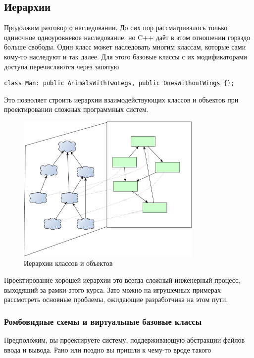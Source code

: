 \documentclass[a4paper,12pt,oneside]{article}
\begin{document}
\subsection{Иерархии}

Продолжим разговор о наследовании. До сих пор рассматривалось только одиночное одноуровневое наследование, но C++ даёт в этом отношении гораздо больше свободы. Один класс может наследовать многим классам, которые сами кому-то наследуют и так далее. Для этого базовые классы с их модификаторами доступа перечисляются через запятую

\begin{lstlisting}
class Man: public AnimalsWithTwoLegs, public OnesWithoutWings {};
\end{lstlisting}

Это позволяет строить иерархии взаимодействующих классов и объектов при проектировании сложных программных систем.

\begin{figure}[h!]
\centering
\includegraphics[width=0.8\textwidth]{illustrations/hierarchies-crop.pdf}
\caption{Иерархии классов и объектов}
\label{fig:hierarchies-crop}
\end{figure}

Проектирование хорошей иерархии это всегда сложный инженерный процесс, выходящий за рамки этого курса. Зато можно на игрушечных примерах рассмотреть основные проблемы, ожидающие разработчика на этом пути.

\subsubsection{Ромбовидные схемы и виртуальные базовые классы}

Предположим, вы проектируете систему, поддерживающую абстракции файлов ввода и вывода. Рано или поздно вы пришли к чему-то вроде такого
\end{document}
